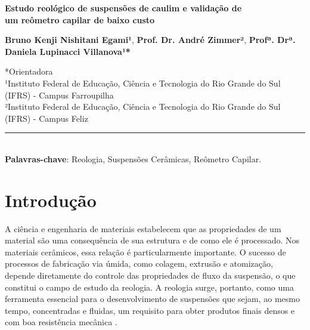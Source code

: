 \documentclass[article,12pt,oneside,a4paper,english,brazil,sumario=tradicional]{abntex2}
\begin{document}
\frenchspacing          %
				
\begin{center}
\Large{\textbf{Estudo reológico de suspensões de caulim e validação de \\ um reômetro capilar de baixo custo}} \vspace{12pt}
	
	\small%
	
	\vspace{12pt}
	
    \textbf{Bruno Kenji Nishitani Egami¹}, \textbf{Prof. Dr. André Zimmer²}, \textbf{Profª. Drª. Daniela Lupinacci Villanova¹*}
    
    \vspace{12pt} %
    
    \footnotesize{
    *Orientadora \\
    ¹Instituto Federal de Educação, Ciência e Tecnologia do Rio Grande do Sul (IFRS) - Campus Farroupilha \\
    ²Instituto Federal de Educação, Ciência e Tecnologia do Rio Grande do Sul (IFRS) - Campus Feliz
    }
\end{center}

\hrule
\SingleSpacing
\noindent


\textual
\pagestyle{simple}
\thispagestyle{empty}

\noindent
\\ \textbf{Palavras-chave}: Reologia, Suspensões Cerâmicas, Reômetro Capilar. 

\section{Introdução}
\label{sec:introducao}
\normalsize
A ciência e engenharia de materiais estabelecem que as propriedades de um material são uma consequência de sua estrutura e de como ele é processado. Nos materiais cerâmicos, essa relação é particularmente importante. O sucesso de processos de fabricação via úmida, como colagem, extrusão e atomização, depende diretamente do controle das propriedades de fluxo da suspensão, o que constitui o campo de estudo da reologia. A reologia surge, portanto, como uma ferramenta essencial para o desenvolvimento de suspensões que sejam, ao mesmo tempo, concentradas e fluidas, um requisito para obter produtos finais densos e com boa resistência mecânica .
\end{document}
